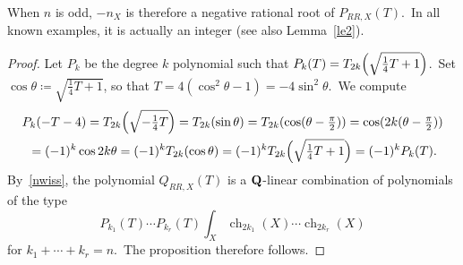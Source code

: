 \documentclass[12pt]{amsart}
\def\Q{{\bf Q}}
\DeclareMathOperator{\ch}{ch}
\theoremstyle{remark}
\begin{document}
When $n$ is odd, $-n_X$ is therefore a negative rational root of $P_{RR,X}(T)$.\ In all known examples, it is actually an integer (see 
also Lemma~\ref{le2}).

\begin{proof}
Let $P_k$ be the degree $k$ polynomial such that $P_k(T)=T_{2k}\Bigl(\sqrt{\tfrac14T+1} \Bigr)$.\  Set $\cos \theta\coloneqq \sqrt{\tfrac14T+1}$, so that $T=4(\cos^2\theta-1)=-4\sin^2\theta$.\ We compute 
\begin{multline*}
P_k(-T-4)=T_{2k}\Bigl(\sqrt{-\tfrac14T } \Bigr)=T_{2k}(\sin \theta) =T_{2k}( \cos( \theta-\tfrac{\pi}{2}))=\cos(2k( \theta-\tfrac{\pi}{2}))\\
{}=(-1)^k\cos 2k\theta=(-1)^kT_{2k}(\cos\theta)=(-1)^kT_{2k}\Bigl(\sqrt{\tfrac14T+1} \Bigr)=(-1)^kP_k(T).
\end{multline*}
By~\eqref{nwiss}, the polynomial $Q_{RR,X}(T)$ is a $\Q$-linear combination of polynomials of the type
\begin{equation*} 
P_{k_1}(T)  \cdots P_{k_r}(T)  \int_X    \ch_{2k_1}(X)\cdots  \ch_{2k_r}(X) 
\end{equation*}
for $k_1+\cdots +k_r=n$.\  The proposition therefore follows.
\end{proof}
\end{document}
